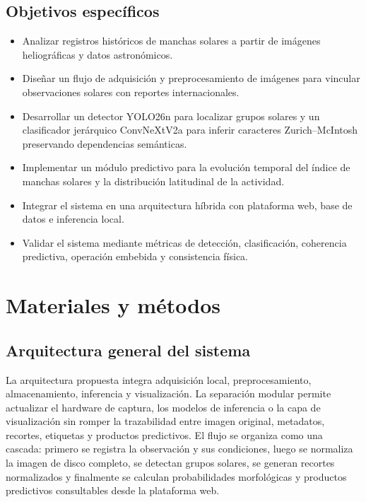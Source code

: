 \documentclass[a4paper,twocolumn,11pt]{article}
\begin{document}
\subsection{Objetivos específicos}
\begin{itemize}
    \item Analizar registros históricos de manchas solares a partir de imágenes heliográficas y datos astronómicos.
    \item Diseñar un flujo de adquisición y preprocesamiento de imágenes para vincular observaciones solares con reportes internacionales.
    \item Desarrollar un detector YOLO26n para localizar grupos solares y un clasificador jerárquico ConvNeXtV2a para inferir caracteres Zurich--McIntosh preservando dependencias semánticas.
    \item Implementar un módulo predictivo para la evolución temporal del índice de manchas solares y la distribución latitudinal de la actividad.
    \item Integrar el sistema en una arquitectura híbrida con plataforma web, base de datos e inferencia local.
    \item Validar el sistema mediante métricas de detección, clasificación, coherencia predictiva, operación embebida y consistencia física.
\end{itemize}

\section{Materiales y métodos}
\subsection{Arquitectura general del sistema}
La arquitectura propuesta integra adquisición local, preprocesamiento, almacenamiento, inferencia y visualización. La separación modular permite actualizar el hardware de captura, los modelos de inferencia o la capa de visualización sin romper la trazabilidad entre imagen original, metadatos, recortes, etiquetas y productos predictivos. El flujo se organiza como una cascada: primero se registra la observación y sus condiciones, luego se normaliza la imagen de disco completo, se detectan grupos solares, se generan recortes normalizados y finalmente se calculan probabilidades morfológicas y productos predictivos consultables desde la plataforma web.
\end{document}
